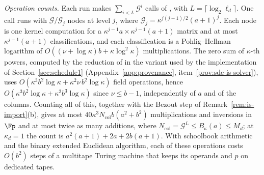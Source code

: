 \begin{remark}
\emph{Operation counts.} Each run makes $\sum_{i<L}\mathcal{G}^i$ calls of \cite[Theorem~11]{IvanyosSantha2015}, with $L = \lceil\log_2 \ell_d\rceil$. One call runs \cite[Lemma~12]{IvanyosSantha2015} with $\mathcal{G}/\mathcal{G}_j$ nodes at level $j$, where $\mathcal{G}_j = \kappa^{j(j-1)/2}(a+1)^j$. Each node is one kernel computation for a $\kappa^{j-1}a\times\kappa^{j-1}(a+1)$ matrix and at most $\kappa^{j-1}(a+1)$ classifications, and each classification is a Pohlig--Hellman logarithm of $O((\nu+\log\kappa)b+\kappa\log^2\kappa)$ multiplications. The zero sum of $\kappa$-th powers, computed by the reduction of \cite[Section~6.1]{vandeWoestijne2005} in the variant used by the implementation of Section~\ref{sec:schedule1} (Appendix~\ref{app:provenance}, item~\ref{prov:sde-is-solver}), uses $O(\kappa^3 b^2\log\kappa + \kappa^2\nu\, b^2\log\kappa)$ field operations, hence $O(\kappa^3 b^2\log\kappa + \kappa^2 b^3\log\kappa)$ since $\nu \le b-1$, independently of $a$ and of the columns. Counting all of this, together with the Bezout step of Remark~\ref{rem:is-import}(b), gives at most $40\kappa^3 N_{\mathrm{col}} b(a^2+b^2)$ multiplications and inversions in $\Fp$ and at most twice as many additions, where $N_{\mathrm{col}} = \mathcal{G}^{L} \le B_{\kappa}(a) \le M_d$; at $\kappa_d = 1$ the count is $a^2(a+1)+2a+2b(a+1)$. With schoolbook arithmetic and the binary extended Euclidean algorithm, each of these operations costs $O(b^2)$ steps of a multitape Turing machine that keeps its operands and $p$ on dedicated tapes.


\end{remark}
